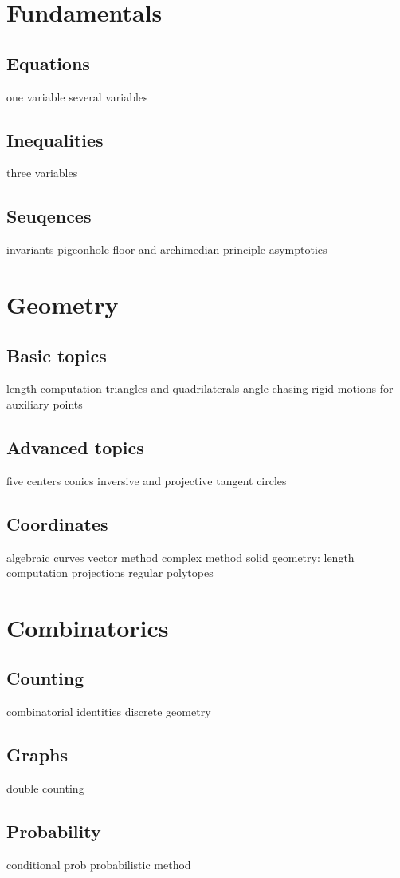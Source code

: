 \documentclass[a4paper]{report}
\begin{document}
\tableofcontents
\chapter{Fundamentals}
\section{Equations}
one variable
several variables
\section{Inequalities}
three variables
\section{Seuqences}
invariants
pigeonhole
floor and archimedian principle
asymptotics

\chapter{Geometry}
\section{Basic topics}
length computation
triangles and quadrilaterals
angle chasing
rigid motions for auxiliary points
\section{Advanced topics}
five centers
conics
inversive and projective
tangent circles
\section{Coordinates}
algebraic curves
vector method
complex method
solid geometry:
	length computation
	projections
	regular polytopes

\chapter{Combinatorics}
\section{Counting}
combinatorial identities
discrete geometry
\section{Graphs}
double counting
\section{Probability}
conditional prob
probabilistic method
\end{document}
